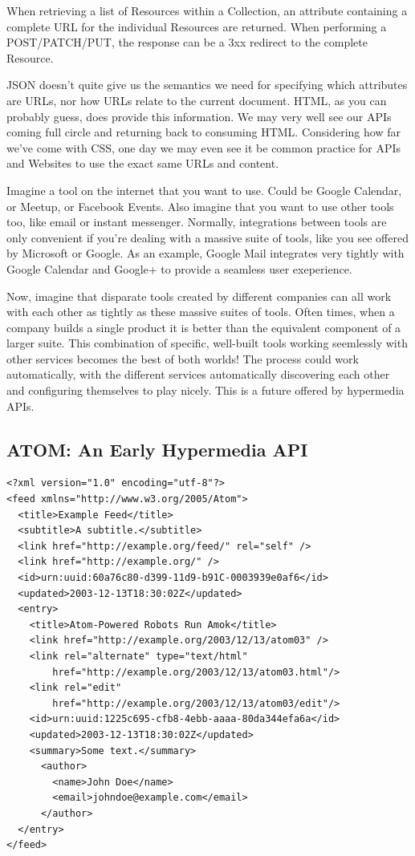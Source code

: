 \documentclass{book}
\begin{document}
When retrieving a list of Resources within a Collection, an attribute containing a complete URL for the individual Resources are returned. When performing a POST/PATCH/PUT, the response can be a 3xx redirect to the complete Resource.

JSON doesn't quite give us the semantics we need for specifying which attributes are URLs, nor how URLs relate to the current document. HTML, as you can probably guess, does provide this information. We may very well see our APIs coming full circle and returning back to consuming HTML. Considering how far we've come with CSS, one day we may even see  it be common practice for APIs and Websites to use the exact same URLs and content.

Imagine a tool on the internet that you want to use. Could be Google Calendar, or Meetup, or Facebook Events. Also imagine that you want to use other tools too, like email or instant messenger. Normally, integrations between tools are only convenient if you're dealing with a massive suite of tools, like you see offered by Microsoft or Google. As an example, Google Mail integrates very tightly with Google Calendar and Google+ to provide a seamless user exeperience.

Now, imagine that disparate tools created by different companies can all work with each other as tightly as these massive suites of tools. Often times, when a company builds a single product it is better than the equivalent component of a larger suite. This combination of specific, well-built tools working seemlessly with other services becomes the best of both worlds! The process could work automatically, with the different services automatically discovering each other and configuring themselves to play nicely. This is a future offered by hypermedia APIs.

\subsection{ATOM: An Early Hypermedia API}

\begin{verbatim}
<?xml version="1.0" encoding="utf-8"?>
<feed xmlns="http://www.w3.org/2005/Atom">
  <title>Example Feed</title>
  <subtitle>A subtitle.</subtitle>
  <link href="http://example.org/feed/" rel="self" />
  <link href="http://example.org/" />
  <id>urn:uuid:60a76c80-d399-11d9-b91C-0003939e0af6</id>
  <updated>2003-12-13T18:30:02Z</updated>
  <entry>
    <title>Atom-Powered Robots Run Amok</title>
    <link href="http://example.org/2003/12/13/atom03" />
    <link rel="alternate" type="text/html"
        href="http://example.org/2003/12/13/atom03.html"/>
    <link rel="edit"
        href="http://example.org/2003/12/13/atom03/edit"/>
    <id>urn:uuid:1225c695-cfb8-4ebb-aaaa-80da344efa6a</id>
    <updated>2003-12-13T18:30:02Z</updated>
    <summary>Some text.</summary>
      <author>
        <name>John Doe</name>
        <email>johndoe@example.com</email>
      </author>
  </entry>
</feed>
\end{verbatim}
\end{document}
